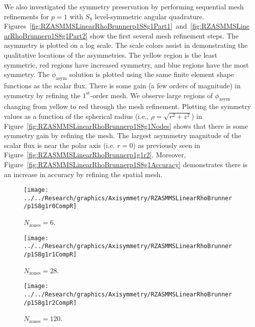 \documentclass[12pt,letterpaper]{article}
\begin{document}
\FloatBarrier

We also investigated the symmetry preservation by performing sequential mesh refinements for $p=1$ with $S_8$ level-symmetric angular quadrature. Figures~\ref{fig:RZASMMSLinearRhoBrunnerp1S8g1Part1}~and~\ref{fig:RZASMMSLinearRhoBrunnerp1S8g1Part2} show the first several mesh refinement steps. The asymmetry is plotted on a log scale. The scale colors assist in demonstrating the qualitative locations of the asymmetries. The yellow region is the least symmetric, red regions have increased symmetry, and blue regions have the most symmetry. The $\phi_\text{asym}$ solution is plotted using the same finite element shape functions as the scalar flux. There is some gain (a few orders of magnitude) in symmetry by refining the $1^\text{st}$-order mesh. We observe large regions of $\phi_\text{asym}$ changing from yellow to red through the mesh refinement. Plotting the symmetry values as a function of the spherical radius (i.e., $\rho=\sqrt{r^2+z^2}$) in Figure~\ref{fig:RZASMMSLinearRhoBrunnerp1S8g1Nodes} shows that there is some symmetry gain by refining the mesh. The largest asymmetry magnitude of the scalar flux is near the polar axis (i.e. $r=0$) as previously seen in Figure~\ref{fig:RZASMMSLinearRhoBrunnerp1g1r2}. Moreover, Figure~\ref{fig:RZASMMSLinearRhoBrunnerp1S8g1Accuracy} demonstrates there is an increase in accuracy by refining the spatial mesh.

\begin{sidewaysfigure}[!htb]
\centering
\begin{subfigure}{0.33\textwidth}
\texttt{[image: ../../Research/graphics/Axisymmetry/RZASMMSLinearRhoBrunner/p1S8g1r0CompR]}
\caption{$N_\text{zones}=6$.}
\end{subfigure}%
\begin{subfigure}{0.33\textwidth}
\texttt{[image: ../../Research/graphics/Axisymmetry/RZASMMSLinearRhoBrunner/p1S8g1r1CompR]}
\caption{$N_\text{zones}=28$.}
\end{subfigure}%
\begin{subfigure}{0.33\textwidth}
\texttt{[image: ../../Research/graphics/Axisymmetry/RZASMMSLinearRhoBrunner/p1S8g1r2CompR]}
\caption{$N_\text{zones}=120$.}
\end{subfigure}
\caption{Relative asymmetry for $p=1$ finite elements on a $1^\text{st}$-order mesh for $S_8$ level-symmetric angular quadrature for $N_\text{zones}=\{6,28,120\}$.}
\label{fig:RZASMMSLinearRhoBrunnerp1S8g1Part1}
\end{sidewaysfigure}
\end{document}
